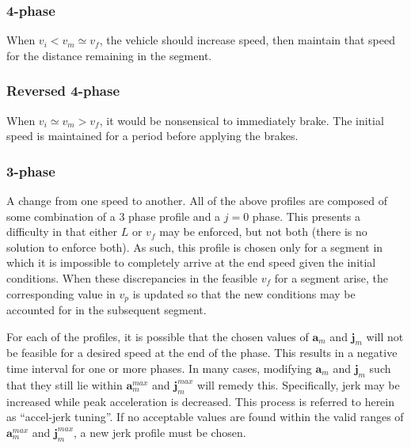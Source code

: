 \documentclass[letterpaper, 10 pt, conference]{ieeeconf}  %
\begin{document}
\subsubsection{4-phase} \label{sec:4phase}

When $v_i < v_m \simeq v_f$, the vehicle should increase speed, then maintain that speed for the distance remaining in the segment.


\subsubsection{Reversed 4-phase} \label{sec:reversed4phase}

When $v_i \simeq v_m > v_f$, it would be nonsensical to immediately brake.
The initial speed is maintained for a period before applying the brakes.


\subsubsection{3-phase} \label{sec:3phase}

A change from one speed to another.
All of the above profiles are composed of some combination of a 3 phase profile and a $j = 0$ phase.
This presents a difficulty in that either $L$ or $v_f$ may be enforced, but not both (there is no solution to enforce both).
As such, this profile is chosen only for a segment in which it is impossible to completely arrive at the end speed given the initial conditions.
When these discrepancies in the feasible $v_f$ for a segment arise, the corresponding value in $v_p$ is updated so that the new conditions may be accounted for in the subsequent segment.

For each of the profiles, it is possible that the chosen values of $\mathbf{a}_m$ and $\mathbf{j}_m$ will not be feasible for a desired speed at the end of the phase.
This results in a negative time interval for one or more phases.
In many cases, modifying $\mathbf{a}_m$ and $\mathbf{j}_m$ such that they still lie within $\mathbf{a}^{max}_m$ and $\mathbf{j}^{max}_m$ will remedy this.
Specifically, jerk may be increased while peak acceleration is decreased.
This process is referred to herein as ``accel-jerk tuning''.
If no acceptable values are found within the valid ranges of $\mathbf{a}^{max}_m$ and $\mathbf{j}^{max}_m$, a new jerk profile must be chosen.
\end{document}
